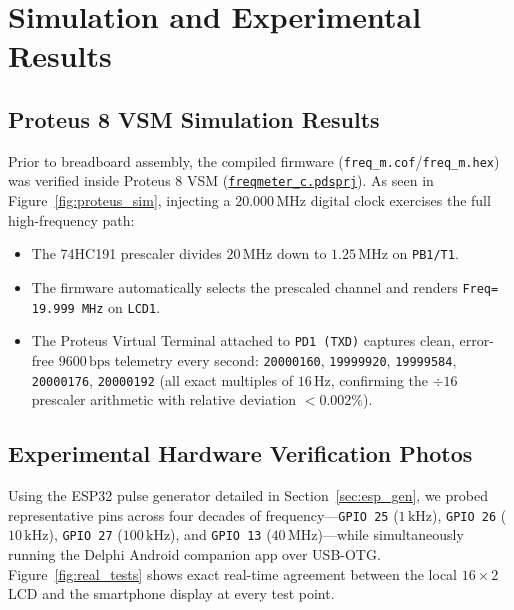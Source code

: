 \documentclass[11pt,a4paper]{article}
\newcommand{\githubrepo}{https://github.com/m7mdelsayegh/frequency_meter}
\newcommand{\ghblob}[2]{\href{\githubrepo/blob/main/#1}{\texttt{#2}}}
\begin{document}
\section{Simulation and Experimental Results}

\subsection{Proteus 8 VSM Simulation Results}
Prior to breadboard assembly, the compiled firmware (\texttt{freq\_m.cof}/\texttt{freq\_m.hex}) was verified inside Proteus 8 VSM (\ghblob{1_Proteus_Simulation/freqmeter_c.pdsprj}{freqmeter\_c.pdsprj}). As seen in Figure~\ref{fig:proteus_sim}, injecting a $20.000\,\text{MHz}$ digital clock exercises the full high-frequency path:
\begin{itemize}[leftmargin=1.5em]
    \item The 74HC191 prescaler divides $20\,\text{MHz}$ down to $1.25\,\text{MHz}$ on \texttt{PB1/T1}.
    \item The firmware automatically selects the prescaled channel and renders \texttt{Freq= 19.999 MHz} on \texttt{LCD1}.
    \item The Proteus Virtual Terminal attached to \texttt{PD1 (TXD)} captures clean, error-free $9600\,\text{bps}$ telemetry every second: \texttt{20000160}, \texttt{19999920}, \texttt{19999584}, \texttt{20000176}, \texttt{20000192} (all exact multiples of $16\,\text{Hz}$, confirming the $\div 16$ prescaler arithmetic with relative deviation $< 0.002\%$).
\end{itemize}

\subsection{Experimental Hardware Verification Photos}
Using the ESP32 pulse generator detailed in Section~\ref{sec:esp_gen}, we probed representative pins across four decades of frequency---\texttt{GPIO 25} ($1\,\text{kHz}$), \texttt{GPIO 26} ($10\,\text{kHz}$), \texttt{GPIO 27} ($100\,\text{kHz}$), and \texttt{GPIO 13} ($40\,\text{MHz}$)---while simultaneously running the Delphi Android companion app over USB-OTG. Figure~\ref{fig:real_tests} shows exact real-time agreement between the local $16\times 2$ LCD and the smartphone display at every test point.
\end{document}
